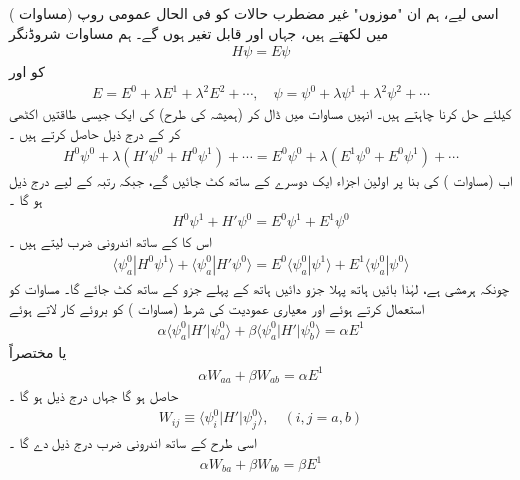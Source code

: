 اسی لیے، ہم ان "موزوں" غیر مضطرب حالات کو فی الحال عمومی روپ (مساوات  )   میں لکھتے ہیں،  جہاں  اور  قابل تغیر ہوں گے۔ ہم مساوات شروڈنگر
\begin{align}\label{مساوات_غیر_مضطرب_مساوات_شروڈنگر}
H \psi = E \psi
\end{align}
کو  اور 
\begin{align}
E = E^0 + \lambda E^1 + \lambda^2 E^2 + \cdots, \quad \psi = \psi^0 + \lambda \psi^1 + \lambda^2 \psi^2 + \cdots
\end{align}
کیلئے حل کرنا چاہتے ہیں۔  انہیں مساوات  میں ڈال  کر  (ہمیشہ کی طرح)   کی ایک جیسی طاقتیں اکٹھی کر کے درج ذیل حاصل  کرتے ہیں ۔
\begin{align*}
H^0 \psi^0 + \lambda (H' \psi^0 + H^0 \psi^1) + \cdots = E^0 \psi^0 + \lambda (E^1 \psi^0 + E^0 \psi^1) + \cdots
\end{align*}
اب  (مساوات )   کی بنا پر اولین اجزاء ایک دوسرے کے ساتھ کٹ جائیں گے،  جبکہ  رتبہ کے لیے درج ذیل ہو گا ۔
\begin{align}
H^0 \psi^1 + H' \psi^0 = E^0 \psi^1 + E^1 \psi^0
\end{align}
اس کا  کے ساتھ اندرونی ضرب لیتے ہیں ۔
\begin{align*} 
\langle \psi_a^0 | H^0 \psi^1 \rangle + \langle \psi_a^0 | H' \psi^0 \rangle = E^0 \langle \psi_a^0 | \psi^1 \rangle + E^1 \langle \psi_a^0 | \psi^0 \rangle
\end{align*}
چونکہ  ہرمشی ہے،  لہٰذا  بائیں ہاتھ پہلا جزو دائیں ہاتھ کے پہلے جزو کے ساتھ کٹ جائے گا۔  مساوات   کو استعمال کرتے ہوئے اور معیاری عمودیت کی شرط (مساوات  )   کو بروئے کار لاتے ہوئے 
\begin{align*}
\alpha \langle \psi_a^0 | H' | \psi_a^0 \rangle + \beta \langle \psi_a^0 | H' | \psi_b^0 \rangle = \alpha E^1
\end{align*}
یا مختصراً
\begin{align}\label{مساوات_غیر_مضطرب_اندرونی_ضرب_اول}
\alpha W_{aa} + \beta W_{ab} = \alpha E^1
\end{align}
حاصل ہو گا جہاں درج ذیل ہو گا ۔
\begin{align}\label{مساوات_غیر_مضطرب_مختصر}
W_{ij} \equiv \langle \psi_i^0 | H' | \psi_j^0 \rangle, \quad (i, j = a, b)
\end{align}
اسی طرح  کے ساتھ اندرونی ضرب درج ذیل دے گا ۔
\begin{align}\label{مساوات_غیر_مضطرب_اندرونی_ضرب_دوم}
\alpha W_{ba} + \beta W_{bb} = \beta E^1
\end{align}

